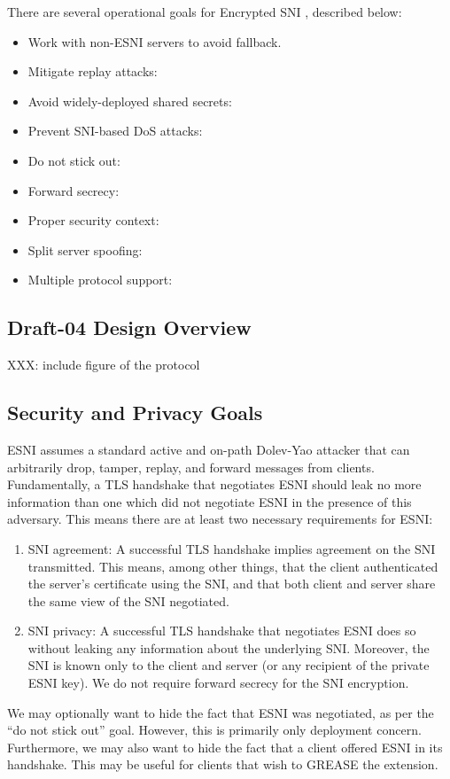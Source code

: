 \documentclass[twoside]{article}
\theoremstyle{definition}
\begin{document}

There are several operational goals for Encrypted SNI \cite{requirements}, described below:
%
\begin{itemize}
  \item Work with non-ESNI servers to avoid fallback.
  \item Mitigate replay attacks:
  \item Avoid widely-deployed shared secrets: 
  \item Prevent SNI-based DoS attacks:
  \item Do not stick out:
  \item Forward secrecy:
  \item Proper security context:
  \item Split server spoofing:
  \item Multiple protocol support:
\end{itemize}
%

\subsection{Draft-04 Design Overview}
XXX: include figure of the protocol

\subsection{Security and Privacy Goals}
ESNI assumes a standard active and on-path Dolev-Yao attacker that can arbitrarily drop, tamper, 
replay, and forward messages from clients. Fundamentally, a TLS handshake that negotiates ESNI should 
leak no more information than one which did not negotiate ESNI in the presence of this adversary. 
This means there are at least two necessary requirements for ESNI:
%
\begin{enumerate}
  \item SNI agreement: A successful TLS handshake implies agreement on the SNI transmitted. This means, among 
  other things, that the client authenticated the server's certificate using the SNI, and that both client and 
  server share the same view of the SNI negotiated.
  \item SNI privacy: A successful TLS handshake that negotiates ESNI does so without leaking any information 
  about the underlying SNI. Moreover, the SNI is known only to the client and server (or any recipient of the
  private ESNI key). We do not require forward secrecy for the SNI encryption.
\end{enumerate}
%
We may optionally want to hide the fact that ESNI was negotiated, as per the ``do not stick out'' goal. However, 
this is primarily only deployment concern. Furthermore, we may also want to hide the fact that a client offered
ESNI in its handshake. This may be useful for clients that wish to GREASE \cite{XXX} the extension.
\end{document}
